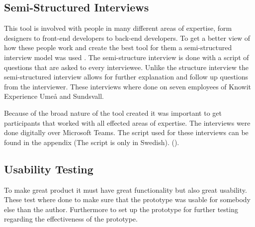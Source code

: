 






\subsection{Semi-Structured Interviews}%
\label{sub:inteviews}
This tool is involved with people in many different areas of expertise, form designers to front-end developers to back-end developers. To get a better view of how these people work and create the best tool for them a semi-structured interview model was used \cite{galletta2013mastering}. The semi-structure interview is done with a script of questions that are asked to every interviewee. Unlike the structure interview the semi-structured interview allows for further explanation and follow up questions from the interviewer. These interviews where done on seven employees of Knowit Experience Umeå and Sundsvall. 

Because of the broad nature of the tool created it was important to get participants that worked with all effected areas of expertise. The interviews were done digitally over Microsoft Teams. The script used for these interviews can be found in the appendix (The script is only in Swedish). ().






\subsection{Usability Testing}%
\label{sub:usertesting}
To make great product it must have great functionality but also great usability. These test where done to make sure that the prototype was usable for somebody else than the author. Furthermore to set up the prototype for further testing regarding the effectiveness of the prototype.

